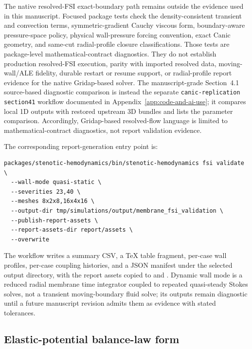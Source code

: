 The native resolved-FSI exact-boundary path remains outside the evidence used
in this manuscript. Focused package tests check the density-consistent transient
and convection terms, symmetric-gradient Cauchy viscous form, boundary-aware
pressure-space policy, physical wall-pressure forcing convention, exact Canic
geometry, and same-cut radial-profile closure classifications. Those tests are
package-level mathematical-contract diagnostics. They do not establish
production resolved-FSI execution, parity with imported resolved data,
moving-wall/ALE fidelity, durable restart or resume support, or radial-profile
report evidence for the native Gridap-based solver. The manuscript-grade
Section~4.1 source-based diagnostic comparison is instead
the separate \texttt{canic-replication section41} workflow documented in
Appendix~\ref{app:code-and-ai-use}; it compares local 1D outputs with restored
upstream 3D bundles and lists the parameter comparison. Accordingly,
Gridap-based resolved-flow language is limited to mathematical-contract
diagnostics, not report validation evidence.

The corresponding report-generation entry point is:
\begin{lstlisting}[basicstyle=\ttfamily\footnotesize,breaklines=true]
packages/stenotic-hemodynamics/bin/stenotic-hemodynamics fsi validate \
  --wall-mode quasi-static \
  --severities 23,40 \
  --meshes 8x2x8,16x4x16 \
  --output-dir tmp/simulations/output/membrane_fsi_validation \
  --publish-report-assets \
  --report-assets-dir report/assets \
  --overwrite
\end{lstlisting}
The workflow writes a summary CSV, a \TeX{} table fragment, per-case wall
profiles, per-case coupling histories, and a JSON manifest under the selected
output directory, with the report assets copied to
 and
. Dynamic wall mode is a reduced radial
membrane time integrator coupled to repeated quasi-steady Stokes solves, not a
transient moving-boundary fluid solve; its outputs remain diagnostic until a
future manuscript revision admits them as evidence with stated tolerances.

\subsection{Elastic-potential balance-law form}
\label{app:num-elastic-potential-form}

